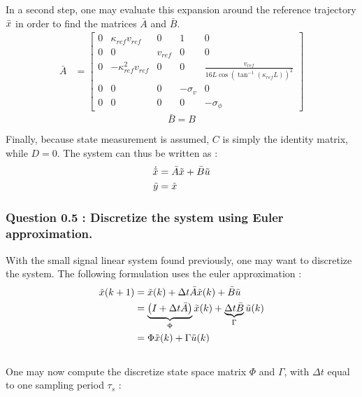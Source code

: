 In a second step, one may evaluate this expansion around the reference trajectory $\Bar{x}$ in order to find the matrices $\bar{A}$ and $\bar{B}$.\\
\begin{align}
    \bar{A} &= 
    \left[ {\begin{array}{ccccc}
        0 &\kappa_{ref} v_{ref} &0 &1 &0 \\
        0 &0 &v_{ref} &0 &0\\
        0 &-\kappa_{ref}^2 v_{ref} &0 &0 &\frac{v_{ref}}{16L \cos(\tan^{-1}(\kappa_{ref} L))^2}\\
        0 &0 &0 &-\sigma_v &0\\
        0 &0 &0 &0 &-\sigma_{\phi}
    \end{array} } \right]
\end{align}
\begin{equation}
    \bar{B} = B
\end{equation}

Finally, because state measurement is assumed, $C$ is simply the identity matrix, while $D = 0$. The system can thus be written as : 
\begin{align}
    \dot{\Tilde{x}} &= \Bar{A}\Tilde{x} + \Bar{B}\Tilde{u}\\
    \Tilde{y} &= \Tilde{x}
\end{align}


\subsubsection*{Question 0.5 : Discretize the system using Euler approximation.}
With the small signal linear system found previously, one may want to discretize the system. The following formulation uses the euler approximation :\\

\begin{equation}\begin{align}
    \Tilde{x}(k+1) &= \Tilde{x}(k) + \Delta t \Bar{A}\Tilde{x}(k) + \Bar{B}\Tilde{u}\\
    &= \underbrace{\left(I + \Delta t \Bar{A}\right)}_{\Phi} \Tilde{x}(k) + \underbrace{\Delta t \Bar{B}}_{\Gamma}\Tilde{u}(k)\\
    &= \Phi \Tilde{x}(k) + \Gamma \Tilde{u}(k)
\end{align}\end{equation}
\\
One may now compute the discretize state space matrix $\Phi$ and $\Gamma$, with $\Delta t$ equal to one sampling period $\tau_s$ :

